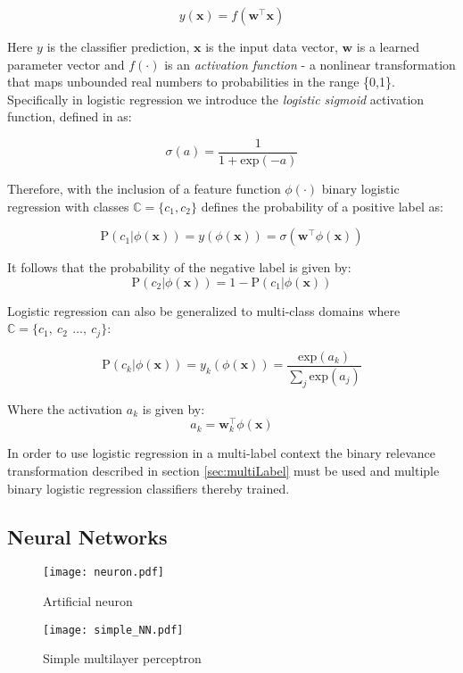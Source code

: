 \documentclass[Dissertation.tex]{subfiles}
\begin{document}
$$ 
y(\mathbf{x}) = f(\mathbf{w}^\top\mathbf{x}) 
$$

Here $ y $ is the classifier prediction, $ \mathbf{x} $ is the input data vector, $ \mathbf{w} $ is a learned parameter vector and $ f(\cdot) $ is an \textit{activation function} - a nonlinear transformation that maps unbounded real numbers to probabilities in the range \{0,1\}. Specifically in logistic regression we introduce the \textit{logistic sigmoid} activation function, defined in  \cite{bishopPatternRecognitionMachine2006} as:

\[ \sigma(a) = \frac{1}{1 + \mathrm{exp}(-a)} \]

Therefore, with the inclusion of a feature function $ \phi(\cdot) $ binary logistic regression with classes $ \mathbb{C} = \{c_1, c_2\} $ \cite{bishopPatternRecognitionMachine2006} defines the probability of a positive label as:

\[ \mathrm{P}(c_1|\phi(\mathbf{x})) = y(\phi(\mathbf{x})) =  \sigma(\mathbf{w}^\top\phi(\mathbf{x}
)) \]

It follows that the probability of the negative label is given by: $$ \mathrm{P}(c_2| \phi(\mathbf{x})) = 1-\mathrm{P}(c_1|\phi(\mathbf{x})) $$

Logistic regression can also be generalized to multi-class domains where $ \mathbb{C} = \{c_1,\ c_2\, \ \dots,\ c_j \} $:

\[ \mathrm{P}(c_k|\phi(\mathbf{x})) = y_k(\phi(\mathbf{x})) =  \frac{\mathrm{exp}(a_k)}{\sum_{j}\mathrm{exp}(a_j)}   \]

Where the activation $ a_k $ is given by:
\[a_k =  \mathbf{w}_k^\top\phi(\mathbf{x})  \]

In order to use logistic regression in a multi-label context the binary relevance transformation described in section \ref{sec:multiLabel} must be used and multiple binary logistic regression classifiers thereby trained.

\subsection{Neural Networks}
\begin{figure}[h]
	
	\centering
	\texttt{[image: neuron.pdf]}
	
	\caption{Artificial neuron}
	\label{fig:neuron}
\end{figure}

\begin{figure}
	\centering
	\texttt{[image: simple\_NN.pdf]}
	\caption{Simple multilayer perceptron}
	\label{fig:multilayerPercep}
\end{figure}
\end{document}
